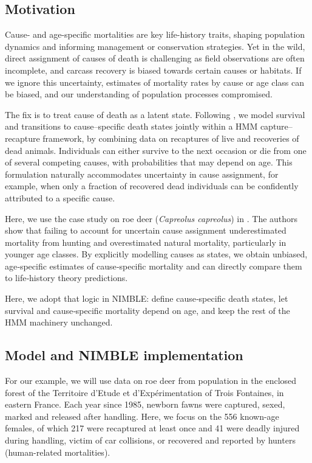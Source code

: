 \documentclass[
  12pt,
]{krantz}
\begin{document}
\subsection{Motivation}\label{motivation-6}

Cause‐ and age-specific mortalities are key life-history traits, shaping population dynamics and informing management or conservation strategies. Yet in the wild, direct assignment of causes of death is challenging as field observations are often incomplete, and carcass recovery is biased towards certain causes or habitats. If we ignore this uncertainty, estimates of mortality rates by cause or age class can be biased, and our understanding of population processes compromised.

The fix is to treat cause of death as a latent state. Following \citet{koons2014}, we model survival and transitions to cause--specific death states jointly within a HMM capture--recapture framework, by combining data on recaptures of live and recoveries of dead animals. Individuals can either survive to the next occasion or die from one of several competing causes, with probabilities that may depend on age. This formulation naturally accommodates uncertainty in cause assignment, for example, when only a fraction of recovered dead individuals can be confidently attributed to a specific cause.

Here, we use the case study on roe deer (\emph{Capreolus capreolus}) in \citet{koons2014}. The authors show that failing to account for uncertain cause assignment underestimated mortality from hunting and overestimated natural mortality, particularly in younger age classes. By explicitly modelling causes as states, we obtain unbiased, age‐specific estimates of cause‐specific mortality and can directly compare them to life‐history theory predictions.

Here, we adopt that logic in NIMBLE: define cause‐specific death states, let survival and cause‐specific mortality depend on age, and keep the rest of the HMM machinery unchanged.

\subsection{Model and NIMBLE implementation}\label{model-and-nimble-implementation-6}

For our example, we will use data on roe deer from population in the enclosed forest of the Territoire d'Etude et d'Expérimentation of Trois Fontaines, in eastern France. Each year since 1985, newborn fawns were captured, sexed, marked and released after handling. Here, we focus on the 556 known-age females, of which 217 were recaptured at least once and 41 were deadly injured during handling, victim of car collisions, or recovered and reported by hunters (human-related mortalities).
\end{document}
